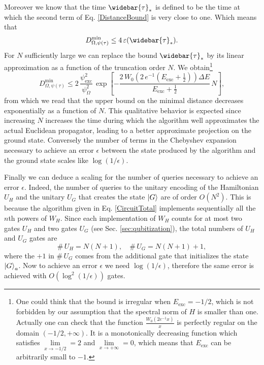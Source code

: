 \documentclass[a4paper,11pt]{article}
\begin{document}
Moreover we know that the time $\widebar{\tau}_*$ is defined to be the time at which the second term of Eq. \eqref{DistanceBound} is very close to one. Which means that 
\begin{equation}
    D^{\mathrm{min}}_{\Omega,\psi(\tau)}\leq 4\,\varepsilon(\widebar{\tau}_*).
\end{equation}
For $N$ sufficiently large we can replace the bound $\widebar{\tau}_*$ by its linear approximation as a function of the truncation order $N$. We obtain\footnote{One could think that the bound is irregular when $E_\mathrm{exc} = -1/2$, which is not forbidden by our assumption that the spectral norm of $H$ is smaller than one. Actually one can check that the function $\frac{W_0(2e^{-1}x)}{x}$ is perfectly regular on the domain $(-1/2, +\infty)$. It is a monotonically decreasing function which satisfies $\underset{x\to -1/2}{\lim} = 2$ and $\underset{x\to +\infty}{\lim} = 0$, which means that $E_\mathrm{exc}$ can be arbitrarily small to $-1$.}
\begin{equation}
    D^{\mathrm{min}}_{\Omega,\psi(\tau)}\leq 2\,\frac{\psi_{\mathrm{exc}}^2}{\psi_\Omega^2}\,\exp\left[-\frac{2\,W_0\left(2\,e^{-1}\left(E_{\mathrm{exc}}+\frac{1}{2}\right)\right)\Delta E}{E_{\mathrm{exc}}+\frac{1}{2}}\,N\right],
\end{equation}
from which we read that the upper bound on the minimal distance decreases exponentially as a function of $N$. This qualitative behavior is expected since increasing $N$ increases the time during which the algorithm well approximates the actual Euclidean propagator, leading to a better approximate projection on the ground state. Conversely the number of terms in the Chebyshev expansion necessary to achieve an error $\epsilon$ between the state produced by the algorithm and the ground state scales like $\log(1/\epsilon)$. 

Finally we can deduce a scaling for the number of queries necessary to achieve an error $\epsilon$. Indeed, the number of queries to the unitary encoding of the Hamiltonian $U_H$ and the unitary $U_G$ that creates the state $\ket{G}$ are of order $O\left(N^2\right)$. This is because the algorithm given in Eq. \eqref{CircuitTotal} implements sequentially all the $n$th powers of $W_H$. Since each implementation of $W_H$ counts for at most two gates $U_H$ and two gates $U_G$ (see Sec. \ref{sec:qubitization}), the total numbers of $U_H$ and $U_G$ gates are
\begin{equation}
\mathrm{\#}\,U_H = N(N+1), \quad \mathrm{\#}\,U_G = N(N+1)+1, 
\end{equation}
where the $+1$ in $\mathrm{\#}\,U_G$ comes from the additional gate that initializes the state $\ket{G}_a$. Now to achieve an error $\epsilon$ we need $\log\left(1/\epsilon\right)$, therefore the same error is achieved with $O\left(\log^2\left(1/\epsilon\right)\right)$ gates.
\end{document}
